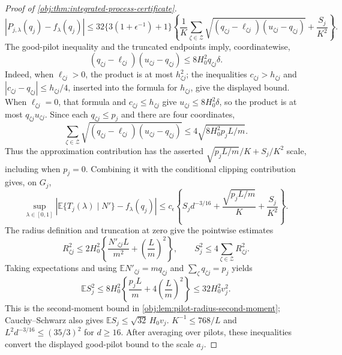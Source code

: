 \begin{proof}[Proof of \cref{obj:thm:integrated-process-certificate}]
\[
|P_{j,\lambda}(q_j)-f_\lambda(q_j)|
\leq32\{3(1+\epsilon^{-1})+1\}
\left\{
\frac1K\sum_{\zeta\in\mathcal Z}
\sqrt{(q_{\zeta j}-\ell_{\zeta j})(u_{\zeta j}-q_{\zeta j})}
+\frac{S_j}{K^2}\right\}.
\]
The good-pilot inequality and the truncated endpoints imply, coordinatewise,
\[
(q_{\zeta j}-\ell_{\zeta j})(u_{\zeta j}-q_{\zeta j})
\leq8H_0^2q_{\zeta j}\delta.
\]
Indeed, when \(\ell_{\zeta j}>0\), the product is at most \(h_{\zeta j}^2\); the inequalities \(c_{\zeta j}>h_{\zeta j}\) and \(|c_{\zeta j}-q_{\zeta j}|\leq h_{\zeta j}/4\), inserted into the formula for \(h_{\zeta j}\), give the displayed bound. When \(\ell_{\zeta j}=0\), that formula and \(c_{\zeta j}\leq h_{\zeta j}\) give \(u_{\zeta j}\leq8H_0^2\delta\), so the product is at most \(q_{\zeta j}u_{\zeta j}\). Since each \(q_{\zeta j}\leq p_j\) and there are four coordinates,
\[
\sum_{\zeta\in\mathcal Z}
\sqrt{(q_{\zeta j}-\ell_{\zeta j})(u_{\zeta j}-q_{\zeta j})}
\leq4\sqrt{8H_0^2p_jL/m}.
\]
Thus the approximation contribution has the asserted \(\sqrt{p_jL/m}/K+S_j/K^2\) scale, including when \(p_j=0\). Combining it with the conditional clipping contribution gives, on \(G_j\),
\[
\sup_{\lambda\in[0,1]}
\left|\mathbb E\{T_j(\lambda)\mid N'\}-f_\lambda(q_j)\right|
 \leq c_\epsilon\left\{
 S_jd^{-3/16}
 +\frac{\sqrt{p_jL/m}}K+\frac{S_j}{K^2}\right\}.
\]
The radius definition and truncation at zero give the pointwise estimates
\[
R_{\zeta j}^{2}
\leq2H_0^2\left\{\frac{N'_{\zeta j}L}{m^2}
+\left(\frac Lm\right)^2\right\},
\qquad
S_j^2\leq4\sum_{\zeta\in\mathcal Z}R_{\zeta j}^2.
\]
Taking expectations and using \(\mathbb E N'_{\zeta j}=m q_{\zeta j}\) and \(\sum_\zeta q_{\zeta j}=p_j\) yields
\[
\mathbb E S_j^2
\leq8H_0^2\left\{\frac{p_jL}{m}
+4\left(\frac Lm\right)^2\right\}
\leq32H_0^2v_j^2.
\]
This is the second-moment bound in \cref{obj:lem:pilot-radius-second-moment}; Cauchy–Schwarz also gives \(\mathbb E S_j\leq\sqrt{32}\,H_0v_j\).
\(K^{-1}\leq768/L\) and \(L^2d^{-3/16}\leq(35/3)^2\) for \(d\geq16\). After averaging over pilots, these inequalities convert the displayed good-pilot bound to the scale \(a_j\).


\end{proof}
